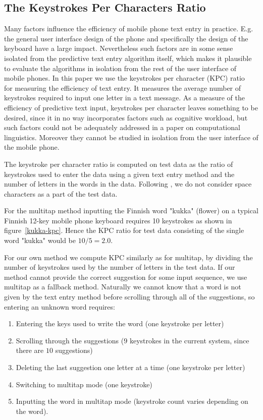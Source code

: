 \documentclass{llncs}
\begin{document}
\subsection{The Keystrokes Per Characters Ratio}

Many factors influence the efficiency of mobile phone text entry in
practice. E.g. the general user interface design of the phone and
specifically the design of the keyboard have a large
impact. Nevertheless such factors are in some sense isolated from the
predictive text entry algorithm itself, which makes it plausible to
evaluate the algorithms in isolation from the rest of the user
interface of mobile phones. In this paper we use the keystrokes per
character (KPC) ratio~\cite{MacKenzie02kspc} for measuring the
efficiency of text entry. It measures the average number of keystrokes
required to input one letter in a text message. As a measure of the
efficiency of predictive text input, keystrokes per character leaves
something to be desired, since it in no way incorporates factors such
as cognitive workload, but such factors could not be adequately
addressed in a paper on computational linguistics. Moreover they
cannot be studied in isolation from the user interface of the mobile
phone.

The keystroke per character ratio is computed on test data as the
ratio of keystrokes used to enter the data using a given text entry
method and the number of letters in the words in the data. Following
\cite{Tantug:2010}, we do not consider space characters as a part of
the test data.

For the multitap method inputting the Finnish word "kukka" (flower) on
a typical Finnish 12-key mobile phone keyboard requires 10 keystrokes
as shown in figure~\ref{kukka-kpc}. Hence the KPC ratio for test data
consisting of the single word "kukka" would be $10/5 = 2.0$.

For our own method we compute KPC similarly as for multitap, by
dividing the number of keystrokes used by the number of letters in the
test data. If our method cannot provide the correct suggestion for
some input sequence, we use multitap as a fallback method. Naturally
we cannot know that a word is not given by the text entry method
before scrolling through all of the suggestions, so entering an
unknown word requires:
\begin{enumerate}
\item Entering the keys used to write the word (one keystroke per letter)
\item Scrolling through the suggestions ($9$ keystrokes in the current system, since there are $10$ suggestions)
\item Deleting the last suggestion one letter at a time (one keystroke per letter)
\item Switching to multitap mode (one keystroke)
\item Inputting the word in multitap mode (keystroke count varies depending on the word).
\end{enumerate}
\end{document}
